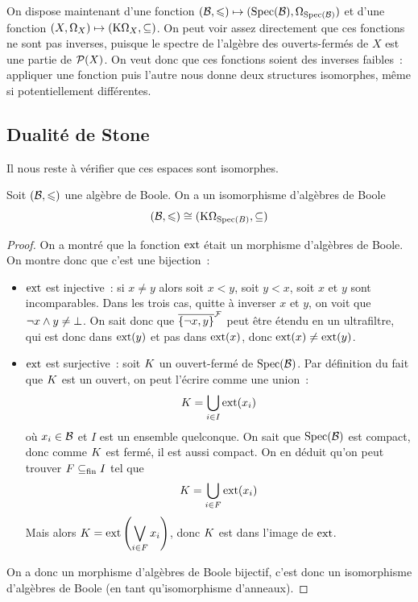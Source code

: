 On dispose maintenant d'une fonction
$(\mathcal{B},\leqslant) \mapsto (\operatorname{Spec}(\mathcal{B}),\Omega_{\operatorname{Spec}(\mathcal{B})})$ et d'une fonction
$(X,\Omega_{X})\mapsto (\mathrm{K}\Omega_{X},\subseteq)$. On peut voir assez
directement que ces fonctions ne sont pas inverses, puisque le spectre de
l'algèbre des ouverts-fermés de $X$ est une partie de $\mathcal{P}(X)$.
On veut donc que ces fonctions soient des inverses \og faibles\fg~: appliquer
une fonction puis l'autre nous donne deux structures isomorphes, même si
potentiellement différentes.

\subsection{Dualité de Stone}

\noindent
Il nous reste à vérifier que ces espaces sont isomorphes.

\begin{lemma}
  Soit $(\mathcal{B},\leqslant)$ une algèbre de Boole. On a un isomorphisme d'algèbres de
  Boole
  \[(\mathcal{B},\leqslant) \cong (\mathrm{K}\Omega_{\operatorname{Spec}(B)},\subseteq)\]
\end{lemma}

\begin{proof}
  On a montré que la fonction $\operatorname{ext}$ était un morphisme d'algèbres de Boole.
  On montre donc que c'est une bijection~:
  \begin{itemize}
  \item $\operatorname{ext}$ est injective~: si $x\neq y$ alors soit $x < y$, soit
    $y < x$, soit $x$ et $y$ sont incomparables. Dans les trois cas,
    quitte à inverser $x$ et $y$, on voit que $\lnot x \wedge y \neq \bot$. On
    sait donc que $\overline{\{\lnot x,y\}}^{\mathcal{F}}$ peut être étendu en un ultrafiltre,
    qui est donc dans $\operatorname{ext}(y)$ et pas dans $\operatorname{ext}(x)$, donc
    $\operatorname{ext}(x)\neq\operatorname{ext}(y)$.
  \item $\operatorname{ext}$ est surjective~: soit $K$ un ouvert-fermé de
    $\operatorname{Spec}(\mathcal{B})$. Par définition du fait que $K$ est un ouvert, on peut
    l'écrire comme une union~:
    \[K = \bigcup_{i \in I} \operatorname{ext}(x_i)\]
    où $x_i \in \mathcal{B}$ et $I$ est un ensemble quelconque. On sait que
    $\operatorname{Spec}(\mathcal{B})$ est compact, donc comme $K$ est fermé, il est aussi
    compact. On en déduit qu'on peut trouver $F\subseteq_{\mathrm{fin}} I$ tel que
    \[K = \bigcup_{i \in F} \operatorname{ext}(x_i)\]
    Mais alors $\displaystyle K = \operatorname{ext}\left(\bigvee_{i \in F} x_i\right)$,
    donc $K$ est dans l'image de $\operatorname{ext}$.
  \end{itemize}

  On a donc un morphisme d'algèbres de Boole bijectif, c'est donc un
  isomorphisme d'algèbres de Boole (en tant qu'isomorphisme d'anneaux).
\end{proof}

